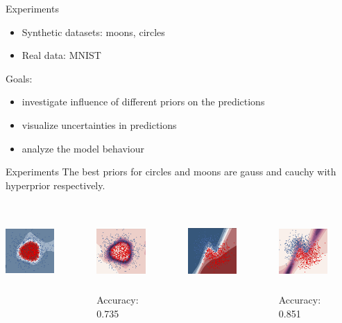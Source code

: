 \documentclass{beamer}
\begin{document}
\begin{frame}{Experiments}
\begin{itemize}
	\item Synthetic datasets: moons, circles
	\item Real data: MNIST
\end{itemize}
Goals:
\begin{itemize}
	\item investigate influence of different priors on the predictions
	\item visualize uncertainties in predictions
	\item analyze the model behaviour
\end{itemize}
\end{frame}
\begin{frame}{Experiments}
	The best priors for circles and moons are gauss and cauchy with hyperprior respectively.
	\begin{columns}[t]
		\centering
			\includegraphics[width=4cm,height=3cm]{pres_pics/inv_cauchy_ppm.png}
			\vspace{-5mm}
			\begin{figure}
				\includegraphics[width=4cm,height=3cm]{pres_pics/inv_cauchy_uncert.png}
				\caption{Accuracy: 0.735}
			\end{figure}
		\centering
		\includegraphics[width=4cm,height=3cm]{pres_pics/inv_gauss_ppm.png}
		\vspace{-5mm}
		\begin{figure}
			\includegraphics[width=4cm,height=3cm]{pres_pics/inv_gauss_uncert.png}
			\caption{Accuracy: 0.851}
		\end{figure}
	\end{columns}
\end{frame}
\end{document}
